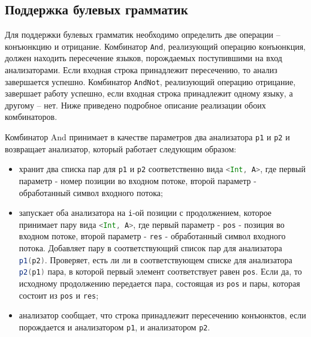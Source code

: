   
  \subsection{Поддержка булевых грамматик}
Для поддержки булевых грамматик необходимо определить две операции -- конъюнкцию и отрицание. Комбинатор \lstinline[language=Scala]{And}, реализующий операцию конъюнкция, должен находить пересечение языков, порождаемых поступившими на вход анализаторами. Если входная строка принадлежит пересечению, то анализ завершается успешно. Комбинатор \lstinline[language=Scala]{AndNot}, реализующий операцию отрицание, завершает работу успешно, если входная строка принадлежит одному языку, а другому -- нет. Ниже приведено подробное описание реализации обоих комбинаторов.

Комбинатор And принимает в качестве параметров два анализатора \lstinline[language=Scala]{p1} и \lstinline[language=Scala]{p2} и возвращает анализатор, который работает следующим образом: 
\begin{itemize}
    \item хранит два списка пар  для \lstinline[language=Scala]{p1} и \lstinline[language=Scala]{p2} соответственно вида \lstinline[language=Scala]{<Int, A>}, где первый параметр - номер позиции во входном потоке, второй параметр - обработанный символ входного потока;
    \item запускает оба анализатора на \lstinline[language=Scala]{i}-ой позиции с продолжением, которое принимает пару вида \lstinline[language=Scala]{<Int, A>}, где первый параметр - \lstinline[language=Scala]{pos} - позиция во входном потоке, второй параметр - \lstinline[language=Scala]{res} - обработанный символ входного потока. Добавляет пару в соответствующий список пар для анализатора \lstinline[language=Scala]{p1(p2)}. Проверяет, есть ли ли в соответствующем списке для анализатора \lstinline[language=Scala]{p2(p1)} пара, в которой первый элемент соответствует равен \lstinline[language=Scala]{pos}. Если да, то исходному продолжению передается пара, состоящая из \lstinline[language=Scala]{pos} и пары, которая состоит из \lstinline[language=Scala]{pos} и \lstinline[language=Scala]{res};
    \item анализатор сообщает, что строка принадлежит пересечению конъюнктов, если порождается и анализатором \lstinline[language=Scala]{p1}, и анализатором \lstinline[language=Scala]{p2}.
\end{itemize}

